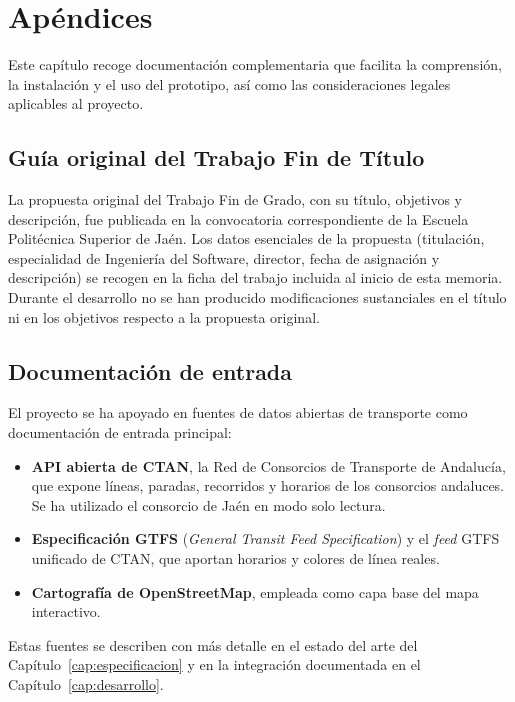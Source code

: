 \chapter{Apéndices}
\label{cap:apendices}

Este capítulo recoge documentación complementaria que facilita la comprensión, la instalación y el uso del prototipo, así como las consideraciones legales aplicables al proyecto.


\section{Guía original del Trabajo Fin de Título}
\label{sec:apendice-guia}

La propuesta original del Trabajo Fin de Grado, con su título, objetivos y descripción, fue publicada en la convocatoria correspondiente de la Escuela Politécnica Superior de Jaén. Los datos esenciales de la propuesta (titulación, especialidad de Ingeniería del Software, director, fecha de asignación y descripción) se recogen en la ficha del trabajo incluida al inicio de esta memoria. Durante el desarrollo no se han producido modificaciones sustanciales en el título ni en los objetivos respecto a la propuesta original.


\section{Documentación de entrada}
\label{sec:apendice-entrada}

El proyecto se ha apoyado en fuentes de datos abiertas de transporte como documentación de entrada principal:

\begin{itemize}
  \item \textbf{API abierta de CTAN}, la Red de Consorcios de Transporte de Andalucía, que expone líneas, paradas, recorridos y horarios de los consorcios andaluces. Se ha utilizado el consorcio de Jaén en modo solo lectura.
  \item \textbf{Especificación GTFS} (\textit{General Transit Feed Specification}) y el \textit{feed} GTFS unificado de CTAN, que aportan horarios y colores de línea reales.
  \item \textbf{Cartografía de OpenStreetMap}, empleada como capa base del mapa interactivo.
\end{itemize}

Estas fuentes se describen con más detalle en el estado del arte del Capítulo~\ref{cap:especificacion} y en la integración documentada en el Capítulo~\ref{cap:desarrollo}.


